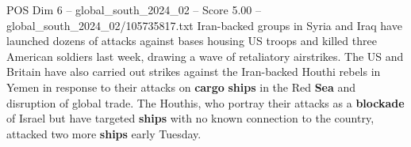 \begin{textsample}{POS Dim 6 – global\_south\_2024\_02 – Score 5.00 – global\_south\_2024\_02/105735817.txt}
Iran-backed groups in Syria and Iraq have launched dozens of attacks against bases housing US troops and killed three American soldiers last week, drawing a wave of retaliatory airstrikes.
The US and Britain have also carried out strikes against the Iran-backed Houthi rebels in Yemen in response to their attacks on \textbf{cargo} \textbf{ships} in the Red \textbf{Sea} and disruption of global trade.
The Houthis, who portray their attacks as a \textbf{blockade} of Israel but have targeted \textbf{ships} with no known connection to the country, attacked two more \textbf{ships} early Tuesday.

\end{textsample}
